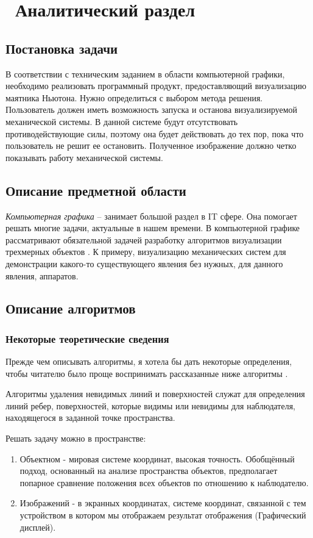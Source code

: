 \chapter{ Аналитический раздел}
\label{cha:analysis}
\section{Постановка задачи}
В соответствии с техническим заданием в области компьютерной графики, необходимо реализовать программный продукт, предоставляющий визуализацию маятника Ньютона. Нужно определиться с выбором метода решения. Пользователь должен иметь возможность запуска и останова визуализируемой механической системы. В данной системе будут отсутствовать противодействующие силы, поэтому она будет действовать до тех пор, пока что пользователь не решит ее остановить. Полученное изображение должно четко показывать работу механической системы.

\section {Описание предметной области}
\textit{Компьютерная графика } -- занимает большой раздел в IT сфере. Она помогает решать многие задачи, актуальные в нашем времени. В компьютерной графике рассматривают обязательной задачей разработку алгоритмов визуализации трехмерных объектов \cite{bib2}. К примеру, визуализацию механических систем для демонстрации какого-то существующего явления без нужных, для данного явления, аппаратов.

\section {Описание алгоритмов}

\subsection {Некоторые теоретические сведения}

Прежде чем описывать алгоритмы, я хотела бы дать некоторые определения, чтобы читателю было проще воспринимать рассказанные ниже алгоритмы \cite{bib2,bib6}.

Алгоритмы удаления невидимых линий и поверхностей служат для определения линий ребер, поверхностей, которые видимы или невидимы для наблюдателя, находящегося в заданной точке пространства.

Решать задачу можно в пространстве:
\begin{enumerate}
	\item Объектном - мировая системе координат, высокая точность. Обобщённый подход, основанный на анализе пространства объектов, предполагает попарное сравнение положения всех объектов по отношению к наблюдателю.
	\item Изображений - в экранных координатах, системе координат, связанной с тем устройством в котором мы отображаем результат отображения (Графический дисплей).
\end{enumerate}

